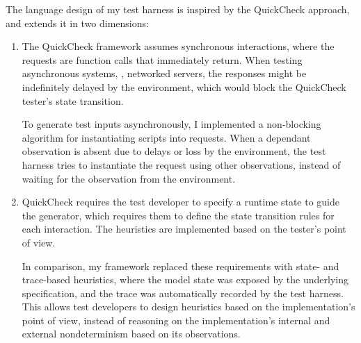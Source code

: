 The language design of my test harness is inspired by the QuickCheck approach,
and extends it in two dimensions:
\begin{enumerate}
\item The QuickCheck framework assumes synchronous interactions, where the
  requests are function calls that immediately return.  When testing
  asynchronous systems, \eg, networked servers, the responses might be
  indefinitely delayed by the environment, which would block the QuickCheck
  tester's state transition.
  
  To generate test inputs asynchronously, I implemented a non-blocking algorithm
  for instantiating scripts into requests.  When a dependant observation is
  absent due to delays or loss by the environment, the test harness tries to
  instantiate the request using other observations, instead of waiting for the
  observation from the environment.

\item QuickCheck requires the test developer to specify a runtime state to guide
  the generator, which requires them to define the state transition rules for
  each interaction.  The heuristics are implemented based on the tester's point
  of view.

  In comparison, my framework replaced these requirements with state- and
  trace-based heuristics, where the model state was exposed by the underlying
  specification, and the trace was automatically recorded by the test harness.
  This allows test developers to design heuristics based on the implementation's
  point of view, instead of reasoning on the implementation's internal and
  external nondeterminism based on its observations.
\end{enumerate}
